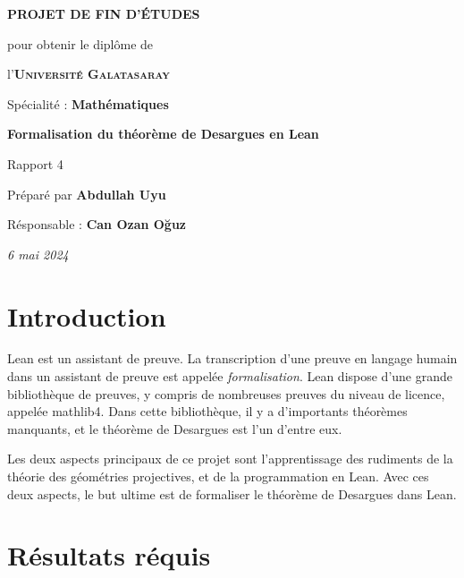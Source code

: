 \documentclass[10pt, oneside]{memoir}
\makeatletter
\newcommand\iraggedright{%
  \let\\\@centercr\@rightskip\@flushglue \rightskip\@rightskip
  \leftskip\z@skip}
\theoremstyle{definition}
\theoremstyle{remark}
\makeatother
\begin{document}
\thispagestyle{empty}
\begin{center}
  \vspace*{\fill}
  

  \vspace{1cm}
  \large{\textbf{PROJET DE FIN D'ÉTUDES}}

  \vspace{0.5cm}
  {\small pour obtenir le diplôme de}

  \vspace{0.5cm}
  l'\textsc{\textbf{Université Galatasaray}}

  {\small Spécialité : \textbf{Mathématiques}}

  \vspace{2.25cm}
  {\Large\textbf{Formalisation du théorème de Desargues en Lean}}

  Rapport 4

  \vspace{1.25cm}
  Préparé par \textbf{Abdullah Uyu}

  Résponsable : \textbf{Can Ozan Oğuz}

  \vspace{2.25cm}
  \textit{6 mai 2024}
  \vspace*{\fill}
\end{center}
\clearpage
\tableofcontents
\iraggedright
{}
\chapter{Introduction}
Lean est un assistant de preuve. La transcription d'une preuve en
langage humain dans un assistant de preuve est appelée
\textit{formalisation}. Lean dispose d'une grande bibliothèque de
preuves, y compris de nombreuses preuves du niveau de licence, appelée
mathlib4. Dans cette bibliothèque, il y a d'importants théorèmes
manquants, et le théorème de Desargues est l'un d'entre eux.

Les deux aspects principaux de ce projet sont l'apprentissage des
rudiments de la théorie des géométries projectives, et de la
programmation en Lean. Avec ces deux aspects, le but ultime est de
formaliser le théorème de Desargues dans Lean.
\chapter{Résultats réquis}
\end{document}
